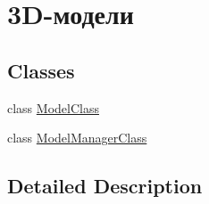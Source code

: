 \hypertarget{group___models}{}\section{3\+D-\/модели}
\label{group___models}
\subsection*{Classes}
\begin{DoxyCompactItemize}
\item 
class \hyperlink{class_model_class}{Model\+Class}
\item 
class \hyperlink{class_model_manager_class}{Model\+Manager\+Class}
\end{DoxyCompactItemize}


\subsection{Detailed Description}
